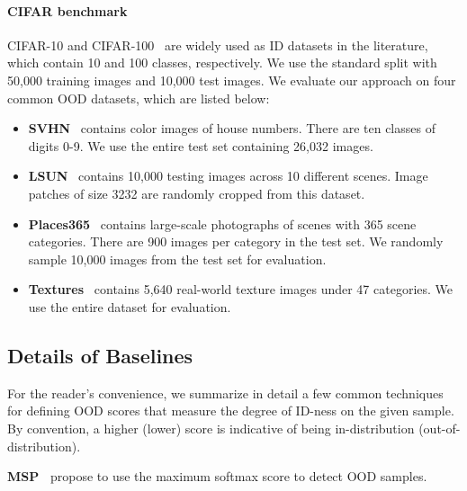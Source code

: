 \documentclass{article}
\begin{document}
\paragraph{CIFAR benchmark} CIFAR-10 and CIFAR-100~\cite{krizhevsky2009learning} are widely used as ID datasets in the literature, which contain 10 and 100 classes, respectively. We use the standard split with 50,000 training images and 10,000 test images. We evaluate our approach on four common OOD datasets, which are listed below:
\begin{itemize}
    \item \textbf{SVHN}~\cite{netzer2011reading} contains color images of house numbers. There are ten classes of digits 0-9. We use the entire test set containing 26,032 images.
    \vspace{-0.1cm}
    \item \textbf{LSUN}~\cite{yu2015lsun} contains 10,000 testing images across 10 different scenes. Image patches of size 3232 are randomly cropped from this dataset.
    \vspace{-0.1cm}
    \item \textbf{Places365}~\cite{zhou2017places} contains large-scale photographs of scenes with 365 scene categories. There are 900 images per category in the test set. We randomly sample 10,000 images from the test set for evaluation.
    \vspace{-0.1cm}
    \item \textbf{Textures}~\cite{cimpoi14describing} contains 5,640 real-world texture images under 47 categories. We use the entire dataset for evaluation.
\end{itemize}

\subsection{Details of Baselines}
\label{app:baseline}

For the reader's convenience, we summarize in detail a few common techniques for defining OOD scores that measure the degree of ID-ness on the given sample.
By convention, a higher (lower) score is indicative of being in-distribution (out-of-distribution).














\textbf{MSP~\cite{hendrycks2016baseline}} propose to use the maximum softmax score to detect OOD samples.
\end{document}
